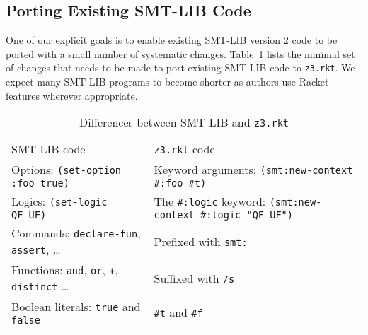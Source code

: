 \subsection{Porting Existing SMT-LIB Code}
\label{sec:porting-smt-lib}

One of our explicit goals is to enable existing SMT-LIB version 2 code to be
ported with a small number of systematic changes. Table~\ref{table:smt-porting}
lists the minimal set of changes that needs to be made to port
existing SMT-LIB code to \texttt{z3.rkt}. We expect many SMT-LIB programs
to become shorter as authors use Racket features wherever appropriate.

\begin{table}[hbt]
\caption{Differences between SMT-LIB and \texttt{z3.rkt}}
\label{table:smt-porting}
\begin{center}
\begin{tabularx}{0.91\textwidth}{lX}
\hline\noalign{\smallskip}
SMT-LIB code & \texttt{z3.rkt} code \\
\noalign{\smallskip}
\hline
\noalign{\smallskip}
Options: \texttt{(set-option :foo true)} & Keyword arguments: \newline \texttt{(smt:new-context \#:foo \#t)} \\

Logics: \texttt{(set-logic QF\_UF)} & The \texttt{\#:logic} keyword: \newline \texttt{(smt:new-context \#:logic "QF\_UF")} \\

Commands: \texttt{declare-fun}, \texttt{assert}, \ldots & Prefixed with \texttt{smt:} \\

Functions: \texttt{and}, \texttt{or}, \texttt{+}, \texttt{distinct} \ldots & Suffixed with \texttt{/s} \\

Boolean literals: \texttt{true} and \texttt{false} & \texttt{\#t} and \texttt{\#f} \\

\hline
\end{tabularx}
\end{center}
\end{table}
